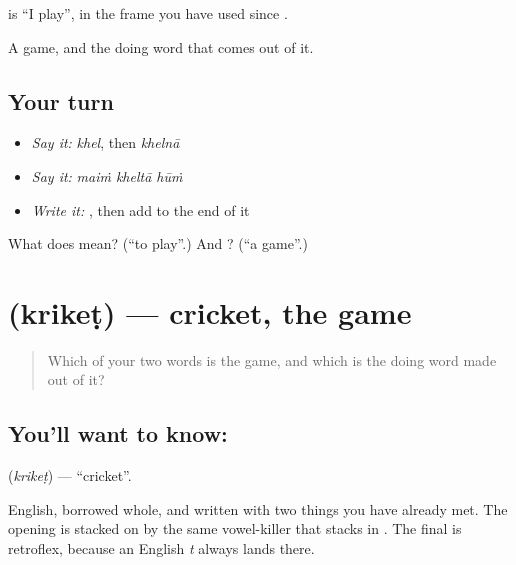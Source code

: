 \textbf{  } is \textquotedblleft{}I play\textquotedblright{}, in the frame you have used since \textbf{   }.

\begin{grammarlens}[title={What you've built}]
A game, and the doing word that comes out of it.
\end{grammarlens}

\subsection*{Your turn}
\begin{itemize}
\raggedright
  \item \emph{Say it:} \emph{khel}, then \emph{khelnā}
  \item \emph{Say it:} \emph{maiṁ kheltā hūṁ}
  \item \emph{Write it:} , then add  to the end of it
\end{itemize}

\begin{tcolorbox}[breakable,colback=teal!4,colframe=teal!35!black,title={Before you move on}]
What does  mean? (\textquotedblleft{}to play\textquotedblright{}.) And ? (\textquotedblleft{}a game\textquotedblright{}.)
\end{tcolorbox}
\section[krikeṭ]{ (krikeṭ) — cricket, the game}

\label{lesson:HI-C70-cricket}



\begin{quote}
Which of your two words is the game, and which is the doing word made out of it?
\end{quote}

\subsection*{You'll want to know: }
\textbf{} (\emph{krikeṭ}) — \textquotedblleft{}cricket\textquotedblright{}.

English, borrowed whole, and written with two things you have already met. The opening  is  stacked on  by the same vowel-killer  that stacks  in . The final  is retroflex, because an English \emph{t} always lands there.

